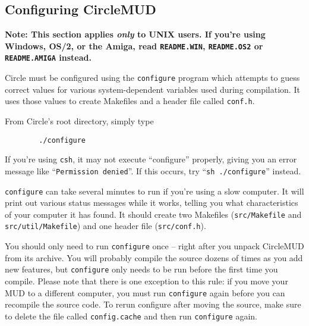 \documentclass[11pt]{article}
\begin{document}
\subsection{Configuring CircleMUD}
{\bf Note: This section applies {\em only} to UNIX users.  If you're using Windows, OS/2, or the Amiga, read \texttt{README.WIN}, \texttt{README.OS2} or \texttt{README.AMIGA} instead.}
\par
Circle must be configured using the \texttt{configure} program which attempts to guess correct values for various system-dependent variables used during compilation.  It uses those values to create Makefiles and a header file called \texttt{conf.h}.
\par
From Circle's root directory, simply type
\begin{verbatim}
        ./configure
\end{verbatim}
If you're using \texttt{csh}, it may not execute ``configure'' properly, giving you an error message like ``\texttt{Permission denied}''.  If this occurs, try ``\texttt{sh ./configure}'' instead. 
\par
\texttt{configure} can take several minutes to run if you're using a slow  computer.  It will print out various status messages while it works, telling you what characteristics of your computer it has found. It should create two Makefiles (\texttt{src/Makefile} and \texttt{src/util/Makefile}) and one header file (\texttt{src/conf.h}).
\par
You should only need to run \texttt{configure} once -- right after you unpack CircleMUD from its archive.  You will probably compile the source dozens of times as you add new features, but \texttt{configure} only needs to be run before the first time you compile. Please note that there is one exception to this rule: if you move your MUD to a different computer, you must run \texttt{configure} again before you can recompile the source code.  To rerun configure after moving the source, make sure to delete the file called \texttt{config.cache} and then run \texttt{configure} again. 
\end{document}
